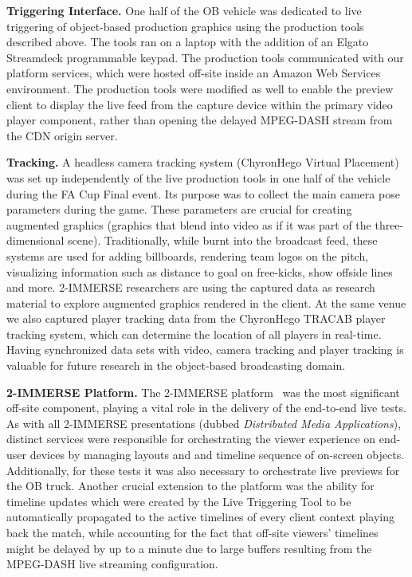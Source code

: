 \documentclass[sigchi-a, authorversion]{acmart}
\begin{document}
\vspace{5pt}\noindent\textbf{Triggering Interface.} One half of the OB vehicle was dedicated to live
triggering of object-based production graphics using the production tools
described above. The tools ran on a laptop with the addition of an Elgato
Streamdeck programmable keypad. The production tools communicated with our
platform services, which were hosted off-site inside an Amazon Web Services
environment. The production tools were modified as well to enable the preview
client to display the live feed from the capture device within the primary video
player component, rather than opening the delayed MPEG-DASH stream from the CDN
origin server.

\vspace{5pt}\noindent\textbf{Tracking.} A headless camera tracking system
(ChyronHego Virtual Placement) was set up independently of the live production
tools in one half of the vehicle during the FA Cup Final event. Its purpose was
to collect the main camera pose parameters during the game. These parameters
are crucial for creating augmented graphics (graphics that blend into video as if
it was part of the three-dimensional scene). Traditionally, while burnt into
the broadcast feed, these systems are used for adding billboards, rendering
team logos on the pitch, visualizing information such as distance to goal on
free-kicks, show offside lines and more. 2-IMMERSE researchers are using the
captured data as research material to explore augmented graphics rendered in
the client. At the same venue we also captured player tracking data from the
ChyronHego TRACAB player tracking system, which can determine the location of all
players in real-time. Having synchronized data sets with video, camera
tracking and player tracking is valuable for future research in the object-based
broadcasting domain.

\vspace{5pt}\noindent\textbf{2-IMMERSE Platform.} The 2-IMMERSE
platform~\cite{jansen2018, kegel2017} was the most significant off-site
component, playing a vital role in the delivery of the end-to-end live
tests. As with all 2-IMMERSE presentations (dubbed \emph{Distributed Media
Applications}), distinct services were responsible for orchestrating the viewer experience on
end-user devices by managing layouts and and timeline sequence of on-screen objects.
Additionally, for these tests it was also necessary to orchestrate live previews for the OB truck.
Another crucial extension to the platform was the ability for timeline updates
which were created by the Live Triggering Tool to be automatically propagated to the active timelines of every client
context playing back the match, while accounting for the fact that off-site
viewers' timelines might be delayed by up to a minute due to large buffers
resulting from the MPEG-DASH live streaming configuration.
\end{document}
